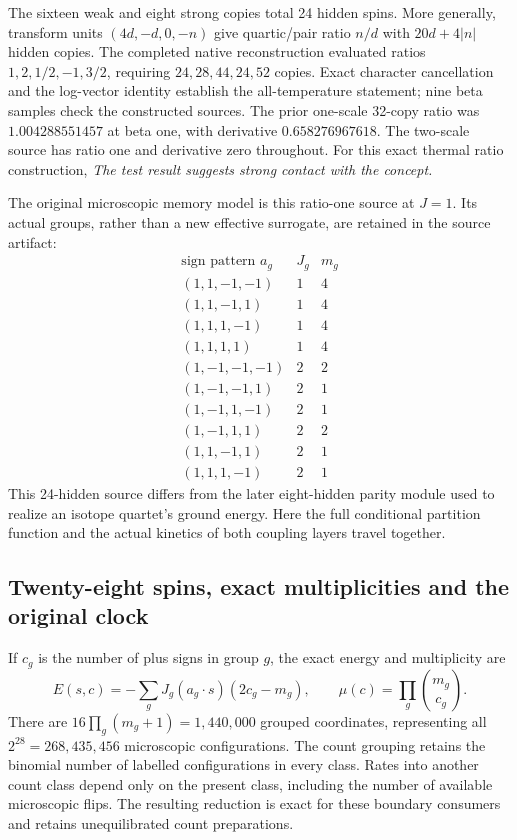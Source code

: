 The sixteen weak and eight strong copies total 24 hidden spins. More
generally, transform units \((4d,-d,0,-n)\) give quartic/pair ratio \(n/d\)
with \(20d+4|n|\) hidden copies. The completed native reconstruction
evaluated ratios \(1,2,1/2,-1,3/2\), requiring \(24,28,44,24,52\) copies.
Exact character cancellation and the log-vector identity establish the
all-temperature statement; nine beta samples check the constructed
sources. The prior one-scale 32-copy ratio was \(1.004288551457\) at
beta one, with derivative \(0.658276967618\). The two-scale source
has ratio one and derivative zero throughout. For this exact thermal
ratio construction, \emph{The test result suggests strong contact with
the concept.}

The original microscopic memory model is this ratio-one source at \(J=1\).
Its actual groups, rather than a new effective surrogate, are retained in
the source artifact:
\[
\begin{array}{c|c|c}
\text{sign pattern }a_g&J_g&m_g\\
\hline
(1,1,-1,-1)&1&4\\
(1,1,-1,1)&1&4\\
(1,1,1,-1)&1&4\\
(1,1,1,1)&1&4\\
(1,-1,-1,-1)&2&2\\
(1,-1,-1,1)&2&1\\
(1,-1,1,-1)&2&1\\
(1,-1,1,1)&2&2\\
(1,1,-1,1)&2&1\\
(1,1,1,-1)&2&1
\end{array}
\]
This 24-hidden source differs from the later eight-hidden parity module
used to realize an isotope quartet's ground energy. Here the full
conditional partition function and the actual kinetics of both coupling
layers travel together.

\subsection{Twenty-eight spins, exact multiplicities and the original clock}

If \(c_g\) is the number of plus signs in group \(g\), the exact energy
and multiplicity are
\[
 E(s,c)=-\sum_gJ_g(a_g\cdot s)(2c_g-m_g),\qquad
 \mu(c)=\prod_g{m_g\choose c_g}.
\]
There are \(16\prod_g(m_g+1)=1{,}440{,}000\) grouped coordinates,
representing all \(2^{28}=268{,}435{,}456\) microscopic configurations.
The count grouping retains the binomial number of labelled configurations
in every class. Rates into another count class depend only on the
present class, including the number of available microscopic flips.
The resulting reduction is exact for these boundary consumers and
retains unequilibrated count preparations.

